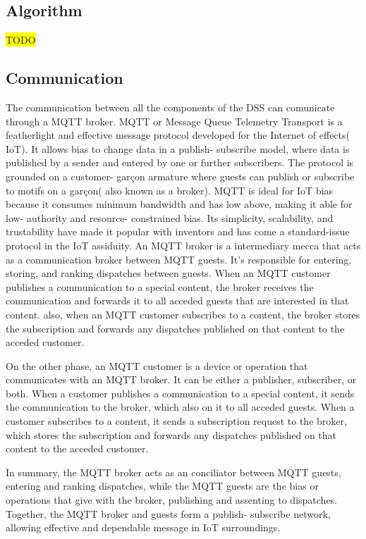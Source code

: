 \documentclass[journal,article,submit,pdftex,moreauthors]{Definitions/mdpi}
\begin{document}
\subsection{Algorithm}
\colorbox{yellow}{TODO}

\subsection{Communication}
The communication between all the components of the DSS can comunicate through a MQTT broker.
MQTT or Message Queue Telemetry Transport is a featherlight and effective message protocol developed for the Internet of effects( IoT). 
It allows bias to change data in a publish- subscribe model, where data is published by a sender and entered by one or further subscribers. The protocol is grounded on a customer- garçon armature where guests can publish or subscribe to motifs on a garçon( also known as a broker). MQTT is ideal for IoT bias because it consumes minimum bandwidth and has low above, making it able for low- authority and resource- constrained bias. 
Its simplicity, scalability, and trustability have made it popular with inventors and has come a standard-issue protocol in the IoT assiduity.
An MQTT broker is a intermediary mecca that acts as a communication broker between MQTT guests. It's responsible for entering, storing, and ranking dispatches between guests. When an MQTT customer publishes a communication to a special content, the broker receives the communication and forwards it to all acceded guests that are interested in that content. also, when an MQTT customer subscribes to a content, the broker stores the subscription and forwards any dispatches published on that content to the acceded customer.

On the other phase, an MQTT customer is a device or operation that communicates with an MQTT broker. It can be either a publisher, subscriber, or both. When a customer publishes a communication to a special content, it sends the communication to the broker, which also on it to all acceded guests. When a customer subscribes to a content, it sends a subscription request to the broker, which stores the subscription and forwards any dispatches published on that content to the acceded customer.

In summary, the MQTT broker acts as an conciliator between MQTT guests, entering and ranking dispatches, while the MQTT guests are the bias or operations that give with the broker, publishing and assenting to dispatches. Together, the MQTT broker and guests form a publish- subscribe network, allowing effective and dependable message in IoT surroundings.
\end{document}
